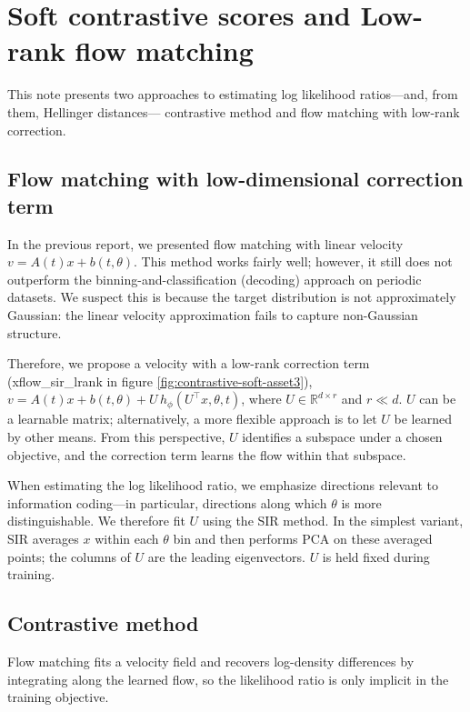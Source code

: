 \section{Soft contrastive scores and Low-rank flow matching}

This note presents two approaches to estimating log likelihood ratios---and, from them, Hellinger distances--- contrastive method and flow matching with low-rank correction.

\subsection{Flow matching with low-dimensional correction term}

In the previous report, we presented flow matching with linear velocity $v = A(t)x + b(t,\theta)$. This method works fairly well; however, it still does not outperform the binning-and-classification (decoding) approach on periodic datasets. We suspect this is because the target distribution is not approximately Gaussian: the linear velocity approximation fails to capture non-Gaussian structure.

Therefore, we propose a velocity with a low-rank correction term (xflow\_sir\_lrank in figure \ref{fig:contrastive-soft-asset3}), $v = A(t)x + b(t,\theta) + U\,h_\phi(U^\top x, \theta, t)$, where $U \in \mathbb{R}^{d \times r}$ and $r \ll d$. $U$ can be a learnable matrix; alternatively, a more flexible approach is to let $U$ be learned by other means. From this perspective, $U$ identifies a subspace under a chosen objective, and the correction term learns the flow within that subspace.

When estimating the log likelihood ratio, we emphasize directions relevant to information coding---in particular, directions along which $\theta$ is more distinguishable. We therefore fit $U$ using the SIR method. In the simplest variant, SIR averages $x$ within each $\theta$ bin and then performs PCA on these averaged points; the columns of $U$ are the leading eigenvectors. $U$ is held fixed during training.

\subsection{Contrastive method}

Flow matching fits a velocity field and recovers log-density differences by integrating along the learned flow, so the likelihood ratio is only implicit in the training objective.

